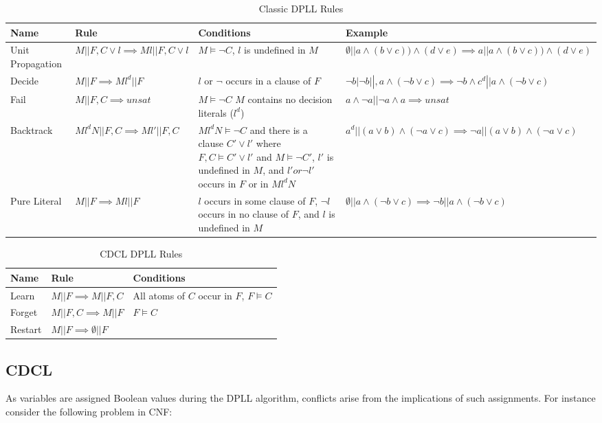 \documentclass[]{final_report}
\begin{document}
\begin{table}[t]
\begin{tabular}{|p{2cm}|p{4cm}|p{4cm}|p{4cm}|}
\hline
Name & Rule & Conditions & Example \\ \hline
Unit Propagation & $M|| F, C \lor l \implies M l || F, C \lor l$ & ​$M \models \lnot C $, $l$ is undefined in $M$ & $\emptyset || a \land (b \lor c) ) \land (d \lor e) \implies a || a \land (b \lor c) ) \land (d \lor e) $ \\ \hline
Decide & $M|| F \implies M l^d || F$ & $l$ or $\lnot$ occurs in a clause of $F$ & $ \lnot b | \lnot b ||, a \land (\lnot b \lor c) \implies\lnot b \land c^d ||a \land (\lnot b \lor c) $ \\ \hline
Fail & $M|| F, C \implies unsat$ & $M \models \lnot C$ $M$ contains no decision literals ($l^d$) & $ a \land \lnot a || \lnot a \land a \implies unsat $ \\ \hline
Backtrack & $M l^d N|| F, C \implies M l' || F, C$ & $M l^d N \models \lnot C$ and there is a clause $C' \lor l'$ where $F, C \models C' \lor l'$ and $M \models \lnot C'$, $l'$ is undefined in $M$, and $l' or \lnot l'$ occurs in $F$ or in $M l^d N$ & $a^d || (a \lor b) \land (\lnot{a} \lor c) \implies \lnot{a} || (a \lor b) \land (\lnot{a} \lor c)$  \\ \hline
Pure Literal & $M|| F \implies Ml || F$ & $l$ occurs in some clause of $F$, $\lnot l$ occurs in no clause of $F$, and $l$ is undefined in $M$ & $\emptyset || a \land (\lnot b \lor c) \implies \lnot b || a \land (\lnot b \lor c) $ \\ \hline
\end{tabular}
\caption{Classic DPLL Rules}
\label{table:classic-dpll-rules}
\end{table}


\begin{table}[t]
\centering
\begin{tabular}{|l|l|l|}
\hline
Name & Rule & Conditions  \\ \hline
Learn & $M|| F \implies M || F, C$ & All atoms of $C$ occur in $F$, $F \models C$  \\ \hline
Forget & $M|| F, C \implies M || F $ & $F \models C$  \\ \hline
Restart & $M|| F \implies \emptyset || F$ &  \\ \hline
\end{tabular}
\caption{CDCL DPLL Rules}
\label{table:cdcl-rules}
\end{table}

\subsection{CDCL}
As variables are assigned Boolean values during the DPLL algorithm, conflicts arise from the implications of such assignments. For instance consider the following problem in CNF:
\end{document}
